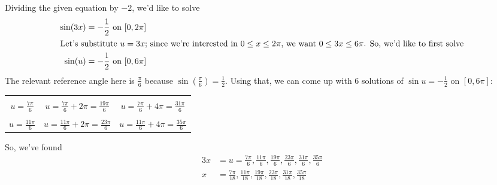 \documentclass{article}
\begin{document}
\begin{enumerate}
\begin{enumerate}
    \begin{solution}
      Dividing the given equation by $-2$, we'd like to solve
      \begin{align*}
        \sin(3x) &= - \frac{1}{2} \text{ on $[0, 2 \pi]$} \\
        \intertext{Let's substitute $u = 3x$; since we're interested in $0
          \leq x \leq 2 \pi$, we want $0 \leq 3x \leq 6 \pi$.  So, we'd
          like to first solve} %
        \sin(u) &= - \frac{1}{2} \text{ on $[0, 6 \pi]$}         
      \end{align*}
      The relevant reference angle here is $\frac{\pi}{6}$ because $\sin
      \left( \frac{\pi}{6} \right) = \frac{1}{2}$.  Using that, we can
      come up with 6 solutions of $\sin u = - \frac{1}{2}$ on $[0, 6
      \pi]$:
      \begin{center}
        \begin{tabular}{ccc}
          \begin{tikzangle}[angle=7*pi/6, func=sin, functick=$-\frac{1}{2}$]
          \end{tikzangle} &
          \begin{tikzangle}[angle=19*pi/6, func=sin, functick=$-\frac{1}{2}$]
          \end{tikzangle} &
          \begin{tikzangle}[angle=31*pi/6, func=sin, functick=$-\frac{1}{2}$]
          \end{tikzangle} \\
          $u = \frac{7 \pi}{6}$ & $u = \frac{7 \pi}{6} + 2 \pi = \frac{19
            \pi}{6}$ & $u = \frac{7 \pi}{6} + 4 \pi = \frac{31 \pi}{6}$
          \\[18pt] 
          \begin{tikzangle}[angle=11*pi/6, func=sin, functick=$-\frac{1}{2}$]
          \end{tikzangle} &
          \begin{tikzangle}[angle=23*pi/6, func=sin, functick=$-\frac{1}{2}$]
          \end{tikzangle} &
          \begin{tikzangle}[angle=35*pi/6, func=sin, functick=$-\frac{1}{2}$]
          \end{tikzangle} \\
          $u = \frac{11 \pi}{6}$ & $u = \frac{11 \pi}{6} + 2 \pi = \frac{23
            \pi}{6}$ & $u = \frac{11 \pi}{6} + 4 \pi = \frac{35 \pi}{6}$
        \end{tabular}
      \end{center}
      So, we've found
      \begin{align*}
        3x &= u = \frac{7 \pi}{6}, \frac{11 \pi}{6}, \frac{19 \pi}{6},
        \frac{23 \pi}{6}, \frac{31 \pi}{6}, \frac{35 \pi}{6} \\
        x &= \boxed{\frac{7 \pi}{18}, \frac{11 \pi}{18}, \frac{19 \pi}{18},
        \frac{23 \pi}{18}, \frac{31 \pi}{18}, \frac{35 \pi}{18}}
      \end{align*}
    \end{solution}


\end{enumerate}
\end{enumerate}
\end{document}
